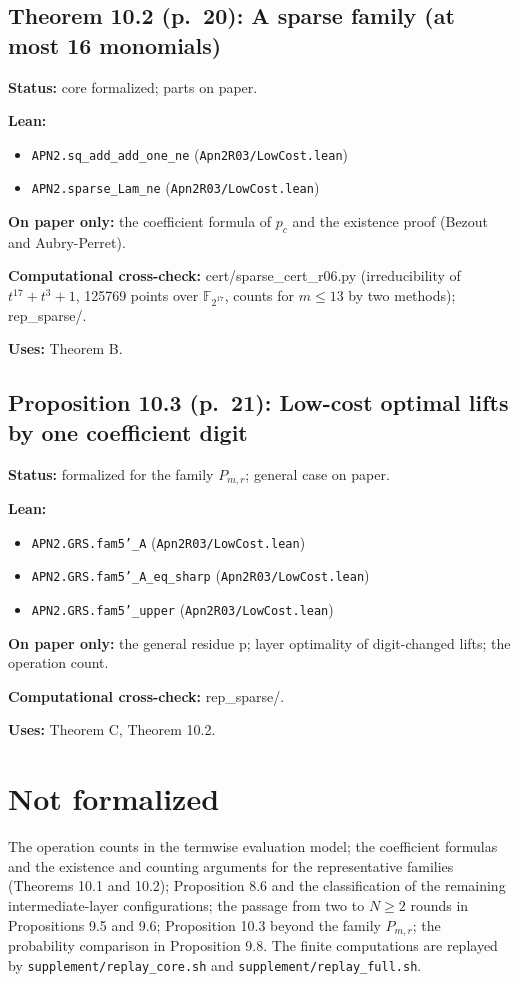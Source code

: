 \documentclass[11pt]{article}
\begin{document}
\subsection*{Theorem 10.2 (p.~20): A sparse family (at most 16 monomials)}
\textbf{Status:} core formalized; parts on paper.\par
\textbf{Lean:}\begin{itemize}\setlength\itemsep{0pt}
\item \texttt{APN2.sq\_add\_add\_one\_ne} \hfill (\texttt{Apn2R03/LowCost.lean})
\item \texttt{APN2.sparse\_Lam\_ne} \hfill (\texttt{Apn2R03/LowCost.lean})
\end{itemize}
\textbf{On paper only:} the coefficient formula of $p_c$ and the existence proof (Bezout and Aubry-Perret).\par
\textbf{Computational cross-check:} cert/sparse\_cert\_r06.py (irreducibility of $t^{17}+t^3+1$, 125769 points over $\mathbb{F}_{2^{17}}$, counts for $m\le13$ by two methods); rep\_sparse/.\par
\textbf{Uses:} Theorem B.\par
\subsection*{Proposition 10.3 (p.~21): Low-cost optimal lifts by one coefficient digit}
\textbf{Status:} formalized for the family $P_{m,r}$; general case on paper.\par
\textbf{Lean:}\begin{itemize}\setlength\itemsep{0pt}
\item \texttt{APN2.GRS.fam5'\_A} \hfill (\texttt{Apn2R03/LowCost.lean})
\item \texttt{APN2.GRS.fam5'\_A\_eq\_sharp} \hfill (\texttt{Apn2R03/LowCost.lean})
\item \texttt{APN2.GRS.fam5'\_upper} \hfill (\texttt{Apn2R03/LowCost.lean})
\end{itemize}
\textbf{On paper only:} the general residue p; layer optimality of digit-changed lifts; the operation count.\par
\textbf{Computational cross-check:} rep\_sparse/.\par
\textbf{Uses:} Theorem C, Theorem 10.2.\par
\section*{Not formalized}
The operation counts in the termwise evaluation model; the coefficient formulas and the existence and counting arguments
for the representative families (Theorems 10.1 and 10.2); Proposition 8.6 and the classification of the remaining
intermediate-layer configurations; the passage from two to $N\ge2$ rounds in Propositions 9.5 and 9.6; Proposition 10.3
beyond the family $P_{m,r}$; the probability comparison in Proposition 9.8. The finite computations are replayed by
\texttt{supplement/replay\_core.sh} and \texttt{supplement/replay\_full.sh}.
\end{document}
